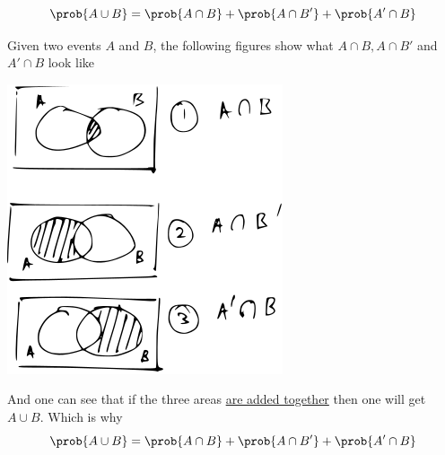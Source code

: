 \documentclass[14pt,fleqn]{extarticle}
\begin{document}
 
\begin{snippet}
    \correct
    
    \[\prob{A\cup B} = \prob{A\cap B} + \prob{A\cap B'} + \prob{A'\cap B} \]
    
    \reason
    
    Given two events $A$ and $B$, the following figures show 
    what $A\cap B, A\cap B'$ and $A'\cap B$ look like 
    
    \begin{center}
\includegraphics[scale=1.4]{98-A.svg}
\end{center}

And one can see that if the three areas \underline{are added together} then one will 
get $A\cup B$. Which is why 
\[\prob{A\cup B} = \prob{A\cap B} + \prob{A\cap B'} + \prob{A'\cap B} \]
\end{snippet} 
\end{document}
